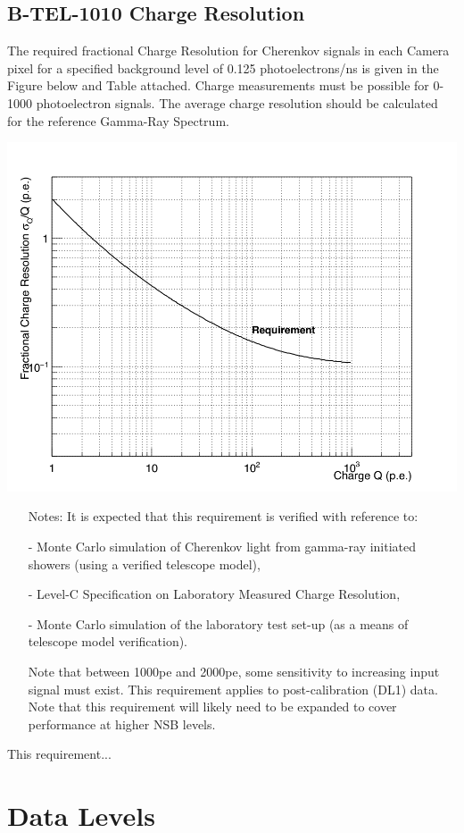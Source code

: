 \begin{requirement}{\subsection{B-TEL-1010 Charge Resolution}}
	The required fractional Charge Resolution for Cherenkov signals in each Camera pixel for a specified background level of 0.125 photoelectrons/ns is given in the Figure below and Table attached. Charge measurements must be possible for 0-1000 photoelectron signals. The average charge resolution should be calculated for the reference Gamma-Ray Spectrum.
    
	\centering\includegraphics[width=0.8\linewidth]{figures/images/charge_res_req}
	\label{fig:charge_res_req}
    
\begin{itemize}
\item [Notes:] It is expected that this requirement is verified with reference to:

- Monte Carlo simulation of Cherenkov light from gamma-ray initiated showers (using a verified telescope model),

- Level-C Specification on Laboratory Measured Charge Resolution,

- Monte Carlo simulation of the laboratory test set-up (as a means of telescope model verification).

Note that between 1000pe and 2000pe, some sensitivity to increasing input signal must exist. \newline
This requirement applies to post-calibration (DL1) data. \newline
Note that this requirement will likely need to be expanded to cover performance at higher NSB levels.
\end{itemize}
\end{requirement}

This requirement...

\section{Data Levels}

